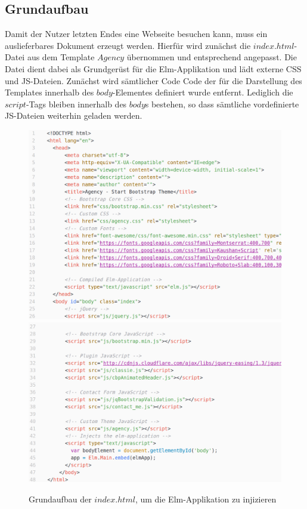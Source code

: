 \subsection{Grundaufbau}
\label{sec:Grundaufbau}
Damit der Nutzer letzten Endes eine Webseite besuchen kann, muss ein auslieferbares Dokument erzeugt werden. Hierfür wird zunächst die $index.html$-Datei aus dem Template $Agency$ übernommen und entsprechend angepasst. Die Datei dient dabei als Grundgerüst für die Elm-Applikation und lädt externe \ac{CSS} und \ac{JS}-Dateien.
Zunächst wird sämtlicher Code Code der für die Darstellung des Templates innerhalb des $body$-Elementes definiert wurde entfernt. Lediglich die $script$-Tags bleiben innerhalb des $body$s bestehen, so dass sämtliche vordefinierte \ac{JS}-Dateien weiterhin geladen werden.
\begin{figure}[p]
\centering
\includegraphics[scale=0.32]{img/index-grundaufbau-1.png}
\includegraphics[scale=0.32]{img/index-grundaufbau-2.png}
\caption{Grundaufbau der $index.html$, um die Elm-Applikation zu injizieren}\label{fig:index-grundaufbau}
\end{figure}

